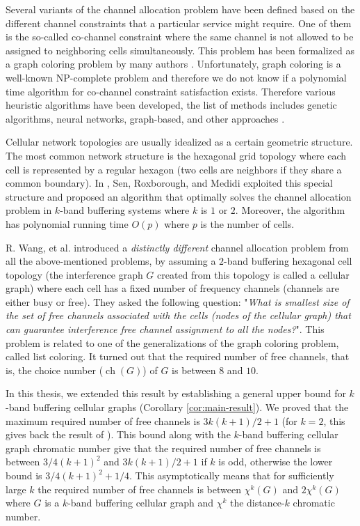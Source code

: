 \documentclass[a4paper, 12pt]{article}
\DeclareMathOperator*{\ch}{ch}
\begin{document}
Several variants of the channel allocation problem have been defined based on the different channel constraints that a particular service might require. One of them is the so-called co-channel constraint where the same channel is not allowed to be assigned to neighboring cells simultaneously. This problem has been formalized as a graph coloring problem by many authors \cite{1456167}. Unfortunately, graph coloring is a well-known NP-complete problem \cite{Kar72} and therefore we do not know if a polynomial time algorithm for co-channel constraint satisfaction exists. Therefore various heuristic algorithms have been developed, the list of methods includes genetic algorithms, neural networks, graph-based, and other approaches \cite{Audhya:2011:SCA:1988563.1988571}.

Cellular network topologies are usually idealized as a certain geometric structure. The most common network structure is the hexagonal grid topology where each cell is represented by a regular hexagon (two cells are neighbors if they share a common boundary). In \cite{662943}, Sen, Roxborough, and Medidi exploited this special structure and proposed an algorithm that optimally solves the channel allocation problem in $k$-band buffering systems where $k$ is $1$ or $2$. Moreover, the algorithm has polynomial running time $O(p)$ where $p$ is the number of cells.

R. Wang, et al. \cite{7248845} introduced a \textit{distinctly different} channel allocation problem from all the above-mentioned problems, by assuming a $2$-band buffering hexagonal cell topology (the interference graph $G$ created from this topology is called a cellular graph) where each cell has a fixed number of frequency channels (channels are either busy or free). They asked the following question: "\textit{What is smallest size of the set of free channels associated with the cells (nodes of the cellular graph) that can guarantee interference free channel assignment to all the nodes?}". This problem is related to one of the generalizations of the graph coloring problem, called list coloring. It turned out that the required number of free channels, that is, the choice number ($\ch(G)$) of $G$ is between $8$ and $10$.

In this thesis, we extended this result by establishing a general upper bound for $k$-band buffering cellular graphs (Corollary \ref{cor:main-result}). We proved that the maximum required number of free channels is $3k(k+1)/2+1$ (for $k=2$, this gives back the result of \cite{7248845}). This bound along with the $k$-band buffering cellular graph chromatic number \cite{662943} give that the required number of free channels is between $3/4(k+1)^2$ and $3k(k+1)/2+1$ if $k$ is odd, otherwise the lower bound is $3/4(k+1)^2 + 1/4$. This asymptotically means that for sufficiently large $k$ the required number of free channels is between $\chi^k(G)$ and $2 \chi^k(G)$ where $G$ is a $k$-band buffering cellular graph and $\chi^k$ the distance-$k$ chromatic number.
\end{document}
